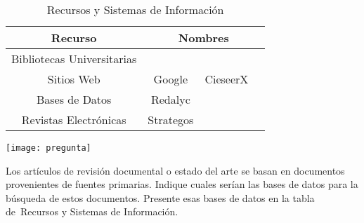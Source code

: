   	\begin{table}[h] 
  	\footnotesize%
  	\begin{center}
  		\footnotesize
  		\begin{tabular}{|c|c|c|c|}
  			\hline
    		   Recurso &   \multicolumn{3}{|c|}{Nombres}  \\
  			\hline  			
  			\tiny{Bibliotecas Universitarias} &   &  &  \\
  				\hline  			
  		\tiny{Sitios Web} & \tiny{Google}  & \tiny{CieseerX} & \\
  			\hline  			
  		\tiny{Bases de Datos}  &  \tiny{Redalyc} &  & \\
  			\hline  			
  		\tiny{Revistas Electr\'onicas} &  \tiny{Strategos} & & \\
  			\hline  	  		
  		\end{tabular}
  	\end{center}
  	\caption{Recursos y Sistemas de Información }
  	\label{tab:recursos}
  \end{table}
  
 
  \begin{marginfigure}[1.2cm]%
 	\texttt{[image: pregunta]}
 \end{marginfigure}
 
 
 \begin{kaobox} [frametitle= Ejercicio ]
 	Los artículos de revisión documental o estado del arte se basan en documentos provenientes de fuentes primarias. Indique cuales serían las bases de datos para la búsqueda de estos documentos.
 	Presente esas bases de datos en la tabla de Recursos y Sistemas de Información.
 	
 	\end{kaobox}
 

 
  
     



